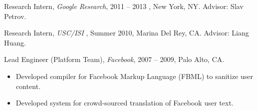 \documentclass[10pt]{article}
\begin{document}
% 
% 

% 

% 

% 

% 

% 

% 

% 

% 

% 

% 

% 

% 

% 

% 

% 

% 

% 

% 

% 

% 

% 

% 

% 

% 

% 

% 

% 


\bigskip






\bigskip

\ind Research Intern, {\sl Google Research}, 2011 -- 2013 , New York, NY.  Advisor: Slav Petrov.



\ind Research Intern, {\sl USC/ISI },  Summer 2010, Marina Del Rey, CA. Advisor: Liang Huang.

\bigskip



\medskip
\ind  Lead Engineer (Platform Team), {\sl Facebook}, 2007 -- 2009, Palo Alto, CA.
\begin{itemize}
	\item Developed compiler for Facebook Markup Language (FBML) to sanitize user content.
	\item Developed system for crowd-sourced translation of Facebook user text.
\end{itemize}
\end{document}
